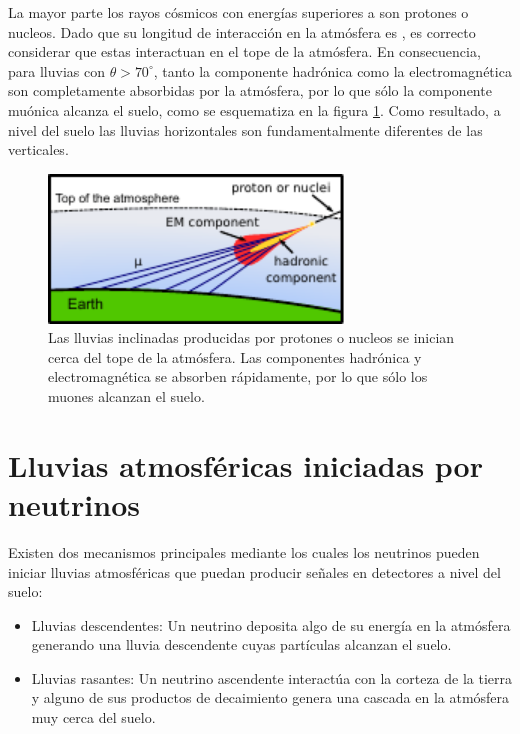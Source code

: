La mayor parte los rayos cósmicos con energías superiores a  son protones o nucleos.
Dado que su longitud de interacción en la atmósfera es , es correcto considerar que estas interactuan en el tope de la atmósfera.
En consecuencia, para lluvias con $\theta>70^\circ$, tanto la componente hadrónica como la electromagnética son completamente absorbidas por la atmósfera, por lo que sólo la componente muónica alcanza el suelo, como se esquematiza en la figura \ref{fig:horizontalHad}.
Como resultado, a nivel del suelo las lluvias horizontales son fundamentalmente diferentes de las verticales.
%
\begin{figure}[h!]
\begin{center}
\includegraphics[width=0.7\textwidth]{fig/EASAuger/horizontal2_english.pdf}
\caption{Las lluvias inclinadas producidas por protones o nucleos se inician cerca del tope de la atmósfera.
Las componentes hadrónica y electromagnética se absorben rápidamente, por lo que sólo los muones alcanzan el suelo.
}
\label{fig:horizontalHad}
\end{center}
\end{figure}

\section{Lluvias atmosf\'ericas iniciadas por neutrinos}

Existen dos mecanismos principales mediante los cuales los neutrinos pueden iniciar lluvias atmosféricas que puedan producir señales en detectores a nivel del suelo:
\begin{itemize}
 \item Lluvias descendentes: Un neutrino deposita algo de su energía en la atmósfera generando una lluvia descendente cuyas partículas alcanzan el suelo.
 \item Lluvias rasantes: Un neutrino ascendente interactúa con la corteza de la tierra y alguno de sus productos de decaimiento genera una cascada en la atmósfera muy cerca del suelo.
\end{itemize}

